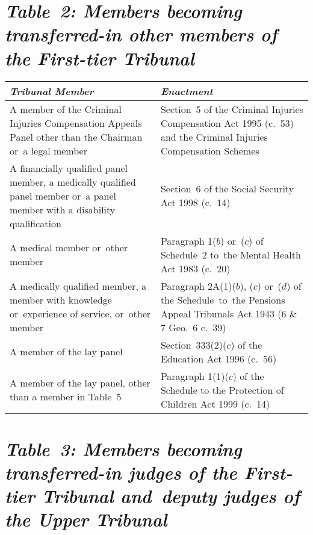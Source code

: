 \documentclass[12pt,a4paper]{article}
\begin{document}
\section*{\itshape\sloppy Table~2: Members becoming transferred-in other members of the First-tier Tribunal}

{\noindent
\begin{longtable}{p{188.27951pt}p{177.71112pt}}
\hline
\itshape Tribunal	Member & \itshape Enactment\\
\hline
\endhead
\hline
\endlastfoot
A member of the Criminal Injuries Compensation Appeals Panel other than the Chairman or~a legal member	&Section~5 of the Criminal Injuries Compensation Act 1995 (c.~53) and the Criminal Injuries Compensation Schemes\\
A financially qualified panel member, a medically qualified panel member or~a panel member with a disability qualification	&Section~6 of the Social Security Act 1998 (c.~14)\\
A medical member or~other member	&Paragraph 1($b$)  or~($c$)  of Schedule~2 to~the Mental Health Act 1983 (c.~20)\\
A medically qualified member, a member with knowledge or~experience of service, or~other member	&Paragraph 2A(1)($b$), ($c$)  or~($d$)  of the Schedule~to~the Pensions Appeal Tribunals Act 1943 (6 \& 7 Geo.~6 c.~39)\\
A member of the lay panel	&Section~333(2)($c$)  of the Education Act 1996 (c.~56)\\
A member of the lay panel, other than a member in Table~5	&Paragraph 1(1)($c$)  of the Schedule to the Protection of Children Act 1999 (c.~14)\\
\end{longtable}

}

\section*{\itshape\sloppy
Table~3: Members becoming transferred-in judges of the First-tier Tribunal and~deputy judges of the Upper Tribunal
}
\end{document}
